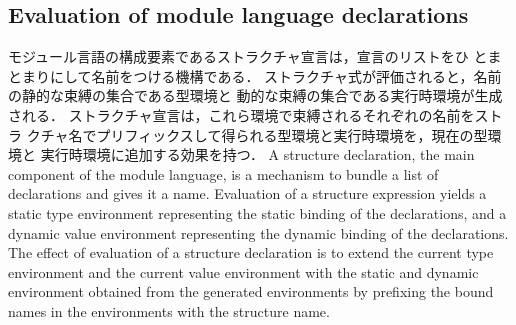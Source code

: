\documentclass{jbook}
\newcommand{\txt}[2]{#2}
\begin{document}
\subsection{\txt{モジュール言語の宣言の評価}{Evaluation of module language declarations}}
	
\ifjp%
	モジュール言語の構成要素であるストラクチャ宣言は，宣言のリストをひ
とまとまりにして名前をつける機構である．
	ストラクチャ式が評価されると，名前の静的な束縛の集合である型環境と
動的な束縛の集合である実行時環境が生成される．
	ストラクチャ宣言は，これら環境で束縛されるそれぞれの名前をストラ
クチャ名でプリフィックスして得られる型環境と実行時環境を，現在の型環境と
実行時環境に追加する効果を持つ．
\else%
	A structure declaration, the main component of the module
language, is a mechanism to bundle a list of declarations and gives it a
name. 
	Evaluation of a structure expression yields a static type
environment representing the static binding of the declarations, and a
dynamic value environment representing the dynamic binding of the 
declarations.
	The effect of evaluation of a structure declaration is to extend
the current type environment and the current value environment with the
static and dynamic environment obtained from the generated environments
by prefixing the bound names in the environments with the structure name.
\fi%
\end{document}
